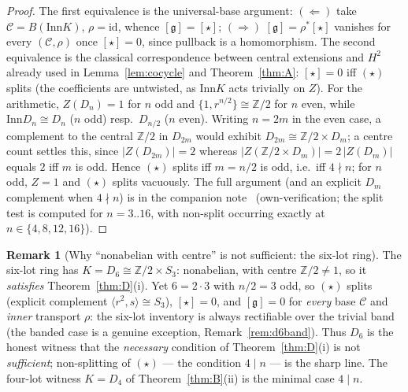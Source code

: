 \documentclass[11pt]{article}
\theoremstyle{definition}
\newtheorem{remark}[theorem]{Remark}
\newcommand{\C}{\mathcal{C}}
\newcommand{\id}{\mathrm{id}}
\newcommand{\Z}{\mathbb{Z}}
\newcommand{\Inn}{\mathrm{Inn}}
\newcommand{\Zc}{Z}
\newcommand{\gerbe}{\mathfrak{g}}
\begin{document}
\begin{proof}[Proof]
The first equivalence is the universal-base argument: $(\Leftarrow)$ take $\C=B(\Inn K)$,
$\rho=\id$, whence $[\gerbe]=[\star]$; $(\Rightarrow)$ $[\gerbe]=\rho^*[\star]$ vanishes for every
$(\C,\rho)$ once $[\star]=0$, since pullback is a homomorphism. The second equivalence is the
classical correspondence between central extensions and $H^2$ already used in
Lemma~\ref{lem:cocycle} and Theorem~\ref{thm:A}: $[\star]=0$ iff $(\star)$ splits (the coefficients
are untwisted, as $\Inn K$ acts trivially on $\Zc$). For the arithmetic, $Z(D_n)=1$ for $n$ odd and
$\{1,r^{n/2}\}\cong\Z/2$ for $n$ even, while $\Inn D_n\cong D_n$ \textup{($n$ odd)} resp.\ $D_{n/2}$
\textup{($n$ even)}. Writing $n=2m$ in the even case, a complement to the central $\Z/2$ in $D_{2m}$
would exhibit $D_{2m}\cong\Z/2\times D_m$; a centre count settles this, since
$|Z(D_{2m})|=2$ whereas $|Z(\Z/2\times D_m)|=2\,|Z(D_m)|$ equals $2$ iff $m$ is odd. Hence $(\star)$
splits iff $m=n/2$ is odd, i.e.\ iff $4\nmid n$; for $n$ odd, $\Zc=1$ and $(\star)$ splits
vacuously. The full argument (and an explicit $D_m$ complement when $4\nmid n$) is in the companion
note~\cite{nlotsharp} (own-verification; the split test is computed for $n=3..16$, with non-split
occurring exactly at $n\in\{4,8,12,16\}$).
\end{proof}

\begin{remark}[Why ``nonabelian with centre'' is not sufficient: the six-lot ring]\label{rem:d6}
The six-lot ring has $K=D_6\cong\Z/2\times S_3$: nonabelian, with centre $\Z/2\neq1$, so it
\emph{satisfies} Theorem~\ref{thm:D}(i). Yet $6=2\cdot3$ with $n/2=3$ odd, so $(\star)$ splits
(explicit complement $\langle r^2,s\rangle\cong S_3$), $[\star]=0$, and $[\gerbe]=0$ for
\emph{every} base $\C$ and \emph{inner} transport $\rho$: the six-lot inventory is always rectifiable
over the trivial band (the banded case is a genuine exception, Remark~\ref{rem:d6band}). Thus $D_6$
is the honest witness that the \emph{necessary} condition of Theorem~\ref{thm:D}(i) is not
\emph{sufficient}; non-splitting of $(\star)$ --- the condition $4\mid n$ --- is the sharp line. The
four-lot witness $K=D_4$ of Theorem~\ref{thm:B}(ii) is the minimal case $4\mid n$.
\end{remark}
\end{document}
